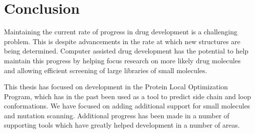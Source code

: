 \section{Conclusion}
\label{section:unsorted/conclusion}

Maintaining the current rate of progress in drug development is a challenging problem.
This is despite advancements in the rate at which new structures are being determined.
Computer assisted drug development has the potential to help maintain this progress by helping focus research on more likely drug molecules and allowing efficient screening of large libraries of small molecules. 

This thesis has focused on development in the Protein Local Optimization Program, which has in the past been used as a tool to predict side chain and loop conformations.
We have focused on adding additional support for small molecules and mutation scanning.
Additional progress has been made in a number of supporting tools which have greatly helped development in a number of areas.
